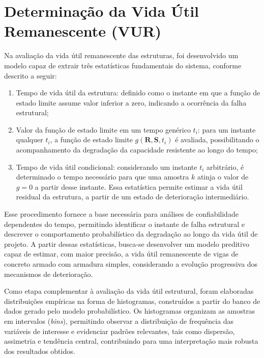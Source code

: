 \section{Determinação da Vida Útil Remanescente (VUR)} \label{sec:res_vur}

Na avaliação da vida útil remanescente das estruturas, foi desenvolvido um modelo capaz de extrair três estatísticas fundamentais do sistema, conforme descrito a seguir:

\begin{enumerate}[label=(\alph*)]
    \item Tempo de vida útil da estrutura: definido como o instante em que a função de estado limite assume valor inferior a zero, indicando a ocorrência da falha estrutural;
    
    \item Valor da função de estado limite em um tempo genérico $t_i$: para um instante qualquer $t_i$, a função de estado limite $g(\textbf{R}, \textbf{S}, t_i)$ é avaliada, possibilitando o acompanhamento da degradação da capacidade resistente ao longo do tempo;
    
    \item Tempo de vida útil condicional: considerando um instante $t_i$ arbitrário, é determinado o tempo necessário para que uma amostra $k$ atinja o valor de $g = 0$ a partir desse instante. Essa estatística permite estimar a vida útil residual da estrutura, a partir de um estado de deterioração intermediário.
\end{enumerate}

Esse procedimento fornece a base necessária para análises de confiabilidade dependentes do tempo, permitindo identificar o instante de falha estrutural e descrever o comportamento probabilístico da degradação ao longo da vida útil de projeto. A partir dessas estatísticas, busca-se desenvolver um modelo preditivo capaz de estimar, com maior precisão, a vida útil remanescente de vigas de concreto armado com armadura simples, considerando a evolução progressiva dos mecanismos de deterioração.

Como etapa complementar à avaliação da vida útil estrutural, foram elaboradas distribuições empíricas na forma de histogramas, construídos a partir do banco de dados gerado pelo modelo probabilístico. Os histogramas organizam as amostras em intervalos (\textit{bins}), permitindo observar a distribuição de frequência das variáveis de interesse e evidenciar padrões relevantes, tais como dispersão, assimetria e tendência central, contribuindo para uma interpretação mais robusta dos resultados obtidos.

